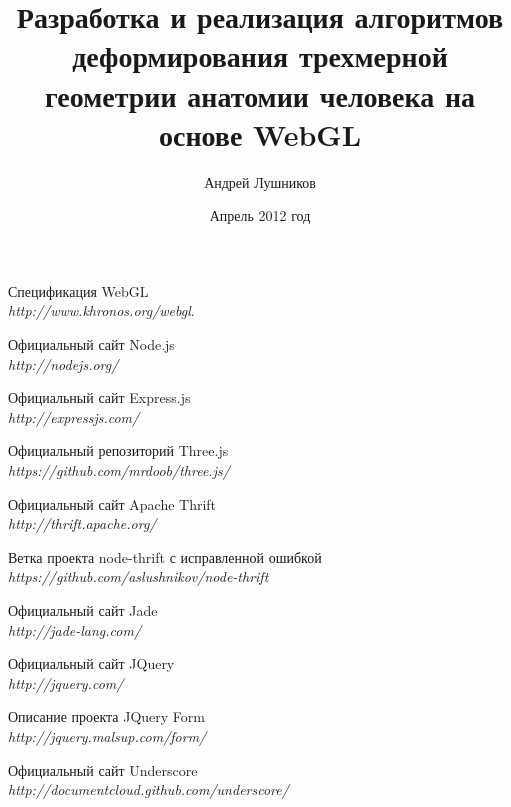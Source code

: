 \documentclass[14pt, a4paper]{extarticle}
\author{Андрей Лушников}
\title{Разработка и реализация алгоритмов деформирования трехмерной геометрии
анатомии человека на основе WebGL}
\date{Апрель 2012 год}
\begin{document}



\tableofcontents
\newpage

















\begin{thebibliography}{9}

  Спецификация WebGL \\
  \emph{http://www.khronos.org/webgl}.

  Официальный сайт Node.js \\
  \emph{http://nodejs.org/}

  Официальный сайт Express.js \\
  \emph{http://expressjs.com/}

  Официальный репозиторий Three.js \\
  \emph{https://github.com/mrdoob/three.js/}

  Официальный сайт Apache Thrift \\
  \emph{http://thrift.apache.org/}

  Ветка проекта node-thrift с исправленной ошибкой \\
  \emph{https://github.com/aslushnikov/node-thrift}

  Официальный сайт Jade \\
  \emph{http://jade-lang.com/}

  Официальный сайт JQuery \\
  \emph{http://jquery.com/}

  Описание проекта JQuery Form \\
  \emph{http://jquery.malsup.com/form/}

  Официальный сайт Underscore \\
  \emph{http://documentcloud.github.com/underscore/}


\end{thebibliography}
\end{document}
